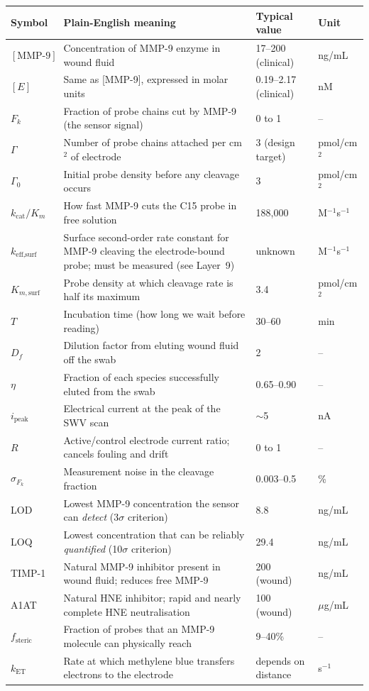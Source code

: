 \documentclass[10pt,a4paper]{article}
\begin{document}
\begin{center}
\begin{tabular}{p{2.4cm}p{6.2cm}p{2.8cm}p{2.0cm}}
\toprule
Symbol & Plain-English meaning & Typical value & Unit \\
\midrule
$[\text{MMP-9}]$ & Concentration of MMP-9 enzyme in wound fluid & 17--200 (clinical) & ng/mL \\
$[E]$ & Same as [MMP-9], expressed in molar units & 0.19--2.17 (clinical) & nM \\
$F_k$ & Fraction of probe chains cut by MMP-9 (the sensor signal) & 0 to 1 & -- \\
$\Gamma$ & Number of probe chains attached per cm$^2$ of electrode & 3 (design target) & pmol/cm$^2$ \\
$\Gamma_0$ & Initial probe density before any cleavage occurs & 3 & pmol/cm$^2$ \\
$k_\text{cat}/K_m$ & How fast MMP-9 cuts the C15 probe in free solution & 188,000 & M$^{-1}$s$^{-1}$ \\
$k_\text{eff,surf}$ & Surface second-order rate constant for MMP-9 cleaving the electrode-bound probe; must be measured (see Layer~9) & unknown & M$^{-1}$s$^{-1}$ \\
$K_{m,\text{surf}}$ & Probe density at which cleavage rate is half its maximum & 3.4 & pmol/cm$^2$ \\
$T$ & Incubation time (how long we wait before reading) & 30--60 & min \\
$D_f$ & Dilution factor from eluting wound fluid off the swab & 2 & -- \\
$\eta$ & Fraction of each species successfully eluted from the swab & 0.65--0.90 & -- \\
$i_\text{peak}$ & Electrical current at the peak of the SWV scan & $\sim$5 & nA \\
$R$ & Active/control electrode current ratio; cancels fouling and drift & 0 to 1 & -- \\
$\sigma_{F_k}$ & Measurement noise in the cleavage fraction & 0.003--0.5 & \% \\
LOD & Lowest MMP-9 concentration the sensor can \textit{detect} (3$\sigma$ criterion) & 8.8 & ng/mL \\
LOQ & Lowest concentration that can be reliably \textit{quantified} (10$\sigma$ criterion) & 29.4 & ng/mL \\
TIMP-1 & Natural MMP-9 inhibitor present in wound fluid; reduces free MMP-9 & 200 (wound) & ng/mL \\
A1AT & Natural HNE inhibitor; rapid and nearly complete HNE neutralisation & 100 (wound) & $\mu$g/mL \\
$f_\text{steric}$ & Fraction of probes that an MMP-9 molecule can physically reach & 9--40\% & -- \\
$k_\text{ET}$ & Rate at which methylene blue transfers electrons to the electrode & depends on distance & s$^{-1}$ \\
\bottomrule
\end{tabular}
\end{center}
\end{document}
